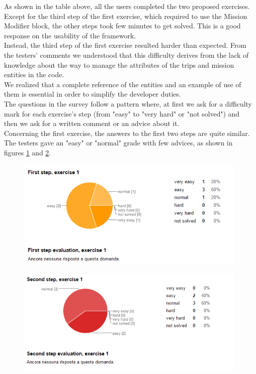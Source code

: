 As shown in the table above, all the users completed the two proposed exercises.
Except for the third step of the first exercise, which required to use the Mission Modifier block, the other steps took few minutes to get solved.
This is a good response on the usability of the framework.
\\
Instead, the third step of the first exercise resulted harder than expected. 
From the testers' comments we understood that this difficulty derives from the lack of knowledge about the way to manage the attributes of the trips and mission entities in the code.
\\
We realized that a complete reference of the entities and an example of use of them is essential in order to simplify the developer duties.
\\

The questions in the survey follow a pattern where, at first we ask for a difficulty mark for each exercise's step (from "easy" to "very hard" or "not solved") and then we ask for a written comment or an advice about it.
\\
Concerning the first exercise,  the answers to the first two steps are quite similar.
The testers gave an "easy" or "normal" grade with few advices, as shown in figures \ref{fig:survey2} and \ref{fig:survey3}.
\\

 \begin{figure}[H]
   \centering
   \includegraphics[width=\linewidth]{pictures/survey2.png}
   \label{fig:survey2}
 \end{figure}

 \begin{figure}[H]
   \centering
   \includegraphics[width=\linewidth]{pictures/survey3.png}
   \label{fig:survey3}
 \end{figure}

